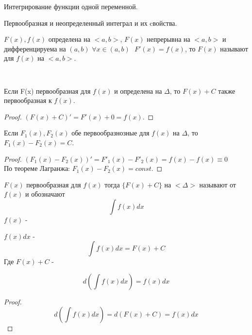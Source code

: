 \begin{title}
  Интегрирование функции одной переменной.
\end{title}

\begin{title}[\Large]
  Первообразная и неопределенный интеграл и их cвойства.
\end{title}

\begin{defin}[первообразной]
  $F(x), f(x)$ определена на $<a,b>$, $F(x)$ непрерывна на $<a,b>$ и
  дифференцируема на $(a,b)$ $\forall x \in (a, b) ~~~ F'(x) = f(x)$,
  то $F(x)$ называют  для $f(x)$ на $<a,b>$.
\end{defin}

\\

Если F(x) первообразная для $f(x)$ и определена на $\Delta$, то $F(x) + C$
также первообразная к $f(x)$.

\begin{proof}
  $(F(x) + C)' = F'(x) + 0 = f(x)$.
\end{proof}


Если $F_{1}(x), F_{2}(x)$ обе первообразнозные для $f(x)$ на $\Delta$,
то $F_{1}(x) - F_{2}(x) = C$.

\begin{proof}
  $(F_{1}(x) - F_{2}(x))' = F'_{1}(x) - F'_{2}(x) = f(x) - f(x) \equiv 0$\\
  По теореме Лагранжа: $F_{1}(x) - F_{2}(x) = const$.
\end{proof}

\begin{defin}
  $F(x)$ первообразная для $f(x)$ тогда $\{ F(x) + C \}$ на $<\Delta>$ называют
   от $f(x)$ и обозначают
  \[
  \int f(x)dx
  \]
  $f(x)$ - 

  $f(x)dx$ - 
  \[
  \int f(x)dx = F(x) + C
  \]
  Где $F(x) + C$ - 
\end{defin}



\[d \left ( \int f(x)dx \right ) = f(x)dx \]

\begin{proof}
  \[
  d \left ( \int f(x)dx \right ) = d(F(x) + C) = f(x)dx
  \]
\end{proof}

